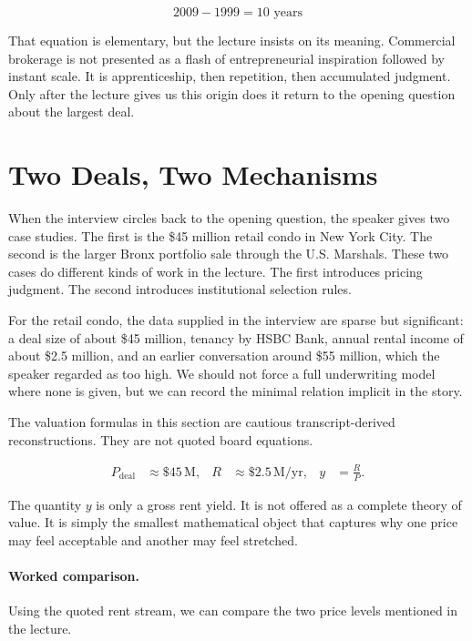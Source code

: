 \begin{equation}
2009 - 1999 = 10 \text{ years}
\end{equation}

That equation is elementary, but the lecture insists on its meaning. Commercial brokerage is not presented as a flash of entrepreneurial inspiration followed by instant scale. It is apprenticeship, then repetition, then accumulated judgment. Only after the lecture gives us this origin does it return to the opening question about the largest deal.

\section{Two Deals, Two Mechanisms}

When the interview circles back to the opening question, the speaker gives two case studies. The first is the \$45 million retail condo in New York City. The second is the larger Bronx portfolio sale through the U.S. Marshals. These two cases do different kinds of work in the lecture. The first introduces pricing judgment. The second introduces institutional selection rules.

For the retail condo, the data supplied in the interview are sparse but significant: a deal size of about \$45 million, tenancy by HSBC Bank, annual rental income of about \$2.5 million, and an earlier conversation around \$55 million, which the speaker regarded as too high. We should not force a full underwriting model where none is given, but we can record the minimal relation implicit in the story.

\begin{remark}
The valuation formulas in this section are cautious transcript-derived reconstructions. They are not quoted board equations.
\end{remark}

\begin{align}
P_{\text{deal}} &\approx \$45\,\text{M}, &
R &\approx \$2.5\,\text{M/yr}, &
y &= \frac{R}{P}.
\end{align}

The quantity \(y\) is only a gross rent yield. It is not offered as a complete theory of value. It is simply the smallest mathematical object that captures why one price may feel acceptable and another may feel stretched.

\paragraph{Worked comparison.}
Using the quoted rent stream, we can compare the two price levels mentioned in the lecture.

